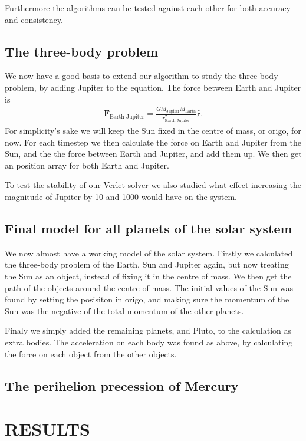\documentclass[a4paper]{article}
\begin{document}
Furthermore the algorithms can be tested against each other for both accuracy and consistency.


\subsection{The three-body problem}
We now have a good basis to extend our algorithm to study the three-body problem, by adding Jupiter to the equation. The force between Earth and Jupiter is
\begin{align}
\boldsymbol{F}_{\text{Earth-Jupiter}} = \frac{G M_\text{Jupiter} M_{\text{Earth}}} {r_{\text{Earth-Jupiter}}^{2}} \boldsymbol{\hat{r}}.
\end{align}
For simplicity's sake we will keep the Sun fixed in the centre of mass, or origo, for now. For each timestep we then calculate the force on Earth and Jupiter from the Sun, and the the force between Earth and Jupiter, and add them up. We then get an position array for both Earth and Jupiter.

To test the stability of our Verlet solver we also studied what effect increasing the magnitude of Jupiter by 10 and 1000 would have on the system.


\subsection{Final model for all planets of the solar system}
We now almost have a working model of the solar system. Firstly we calculated the three-body problem of the Earth, Sun and Jupiter again, but now treating the Sun as an object, instead of fixing it in the centre of mass. We then get the path of the objects around the centre of mass. The initial values of the Sun was found by setting the posisiton in origo, and making sure the momentum of the Sun was the negative of the total momentum of the other planets. 

Finaly we simply added the remaining planets, and Pluto, to the calculation as extra bodies. The acceleration on each body was found as above, by calculating the force on each object from the other objects. 


\subsection{The perihelion precession of Mercury}



\section{RESULTS}
\end{document}
